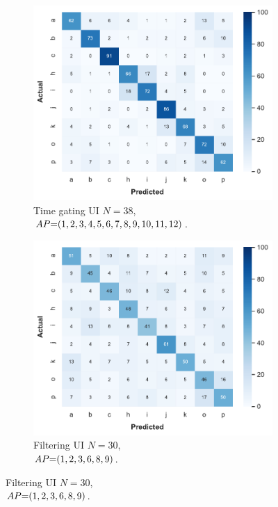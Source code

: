\begin{figure}[!t]
    \begin{subfigure}{.49\textwidth}
        \centering
        \includegraphics[width=.99\linewidth]{Figures/RadarExperiments/Datasets/ThroughMaterials/Wood/confusion-timegating-ui.pdf}  
        \vspace{-15pt}
        \captionsetup{width=.99\linewidth}
        \caption{Time gating UI $N{=}38$, \\ $\splitatcommas{AP{=}(1, 2, 3, 4, 5, 6, 7, 8, 9, 10, 11, 12)}$.}
        \label{fig:radar-experiments:through-materials:wood-confusion:timegating-ui}
    \end{subfigure}
    \begin{subfigure}{.49\textwidth}
        \centering
        \includegraphics[width=.99\linewidth]{Figures/RadarExperiments/Datasets/ThroughMaterials/Wood/confusion-filtering-ui.pdf}
        \vspace{-15pt}
        \captionsetup{width=.99\linewidth}
        \caption{Filtering UI $N{=}30$, \\ $\splitatcommas{AP{=}(1, 2, 3, 6, 8, 9)}$.}
        \label{fig:radar-experiments:through-materials:wood-confusion:filtering-ui}
    \end{subfigure}
    

\end{figure}
